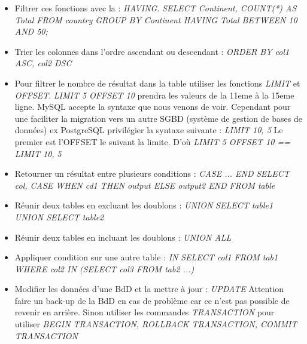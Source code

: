 \documentclass[12pt,a4paper]{article}
\begin{document}
\begin{itemize}
\item Filtrer ces fonctions avec la : \textit{HAVING}.
\newline \textit{SELECT Continent, COUNT(*) AS Total  FROM country GROUP BY Continent HAVING Total BETWEEN 10 AND 50;}
\item Trier les colonnes dans l'ordre ascendant ou descendant : 
\newline \textit{ORDER BY col1 ASC, col2 DSC}
\item Pour filtrer le nombre de résultat dans la table utiliser les fonctions \textit{LIMIT} et \textit{OFFSET}.
\newline \textit{LIMIT 5 OFFSET 10} prendra les valeurs de la 11eme à la 15eme ligne.
\newline MySQL accepte la syntaxe que nous venons de voir. Cependant pour une faciliter la migration vers un autre SGBD (système de gestion de bases de données) ex PostgreSQL privilégier la syntaxe suivante :
\newline \textit{LIMIT 10, 5} Le premier est l'OFFSET le suivant la limite.
\newline D'où \textit{LIMIT 5 OFFSET 10 == LIMIT 10, 5}
\item Retourner un résultat entre plusieurs conditions : \textit{CASE ... END}
\newline \textit{SELECT col, CASE 
\newline WHEN cd1 THEN output
\newline ELSE output2
\newline END FROM table}
\item Réunir deux tables en excluant les doublons : \textit{UNION}
\newline \textit{SELECT table1 UNION SELECT table2}
\item Réunir deux tables en incluant les doublons : \textit{UNION ALL}
\item Appliquer condition sur une autre table : \textit{IN}
\newline \textit{SELECT col1 FROM tab1 WHERE col2 IN (SELECT col3 FROM tab2 ...)}
\item Modifier les données d'une BdD et la mettre à jour : \textit{UPDATE}
\newline Attention faire un back-up de la BdD en cas de problème car ce n'est pas possible de revenir en arrière. \newline Sinon utiliser les commandes \textit{TRANSACTION} pour utiliser \textit{BEGIN TRANSACTION, ROLLBACK TRANSACTION, COMMIT TRANSACTION}

\end{itemize}
\end{document}

